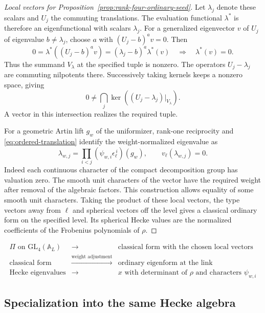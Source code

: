 \begin{proof}[Local vectors for Proposition~\ref{prop:rank-four-ordinary-seed}]
Let \(\lambda_j\) denote these scalars and \(U_j\) the commuting
translations. The evaluation functional \(\lambda^*\) is therefore an eigenfunctional with scalars \(\lambda_j\). For a generalized eigenvector \(v\) of \(U_j\) of eigenvalue \(b\ne\lambda_j\), choose \(a\) with \((U_j-b)^av=0\). Then
\[
 0=\lambda^*((U_j-b)^av)=(\lambda_j-b)^a\lambda^*(v)\quad\Longrightarrow\quad \lambda^*(v)=0 .
\] Thus
the summand \(V_\lambda\) at the specified tuple is nonzero.
The operators \(U_j-\lambda_j\) are commuting nilpotents there.
Successively taking kernels keeps a nonzero space, giving
\[
 0\ne\bigcap_j\ker((U_j-\lambda_j)|_{V_\lambda}).
\]
A vector in this intersection realizes the required tuple.

For a geometric Artin lift \(g_w\) of the uniformizer,
rank-one reciprocity and \eqref{eq:ordered-translation} identify
the weight-normalized eigenvalue as
\[
    \lambda_{w,j}=\prod_{i<j}(\psi_{w,i}\epsilon_\ell^{\,i})(g_w),
             \qquad v_\ell(\lambda_{w,j})=0.
\]
Indeed each continuous character of the compact decomposition
group has valuation zero.
The smooth unit characters of the vector have the required
weight after removal of the algebraic factors. This
construction allows equality of some smooth unit characters.
Taking the product of these local vectors, the type vectors
away from \(\ell\) and spherical vectors off the level gives
a classical ordinary form on the specified level. Its
spherical Hecke values are the normalized coefficients of
the Frobenius polynomials of \(\rho\).

\end{proof}

\begin{construction}
\[
\begin{array}{rcl}
\Pi\text{ on }\mathrm{GL}_4(\mathbb A_L)
    &\longrightarrow&\text{classical form with the chosen local vectors}\\
\text{classical form}&\xrightarrow{\text{weight adjustment}}&
        \text{ordinary eigenform at the link}\\
\text{Hecke eigenvalues}&\longrightarrow&
        x\text{ with determinant of }\rho\text{ and characters }\psi_{w,i}
\end{array}
\]
\caption{The specialization uses the local choices at the link where the seed is being admitted. The ordered character list is retained at that level.}\label{fig:ordinary-seed-admission}
\end{construction}

\subsection{Specialization into the same Hecke algebra}

